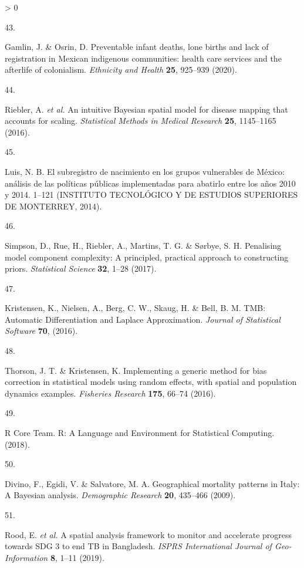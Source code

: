 \documentclass[
]{article}
\newlength{\cslhangindent}
\newlength{\csllabelwidth}
\newenvironment{CSLReferences}[2] %
 {%
  \setlength{\parindent}{0pt}
  \ifodd #1 \everypar{\setlength{\hangindent}{\cslhangindent}}\ignorespaces\fi
  \ifnum #2 > 0
  \setlength{\parskip}{#2\baselineskip}
  \fi
 }%
 {}
\newcommand{\CSLLeftMargin}[1]{\parbox[t]{\csllabelwidth}{#1}}
\newcommand{\CSLRightInline}[1]{\parbox[t]{\linewidth - \csllabelwidth}{#1}\break}
\begin{document}
\begin{CSLReferences}{0}{0}
\leavevmode\hypertarget{ref-Gamlin2020}{}%
\CSLLeftMargin{43. }
\CSLRightInline{Gamlin, J. \& Osrin, D. {Preventable infant deaths, lone births and lack of registration in Mexican indigenous communities: health care services and the afterlife of colonialism}. \emph{Ethnicity and Health} \textbf{25}, 925--939 (2020).}

\leavevmode\hypertarget{ref-Riebler2016}{}%
\CSLLeftMargin{44. }
\CSLRightInline{Riebler, A. \emph{et al.} {An intuitive Bayesian spatial model for disease mapping that accounts for scaling}. \emph{Statistical Methods in Medical Research} \textbf{25}, 1145--1165 (2016).}

\leavevmode\hypertarget{ref-Luis2014}{}%
\CSLLeftMargin{45. }
\CSLRightInline{Luis, N. B. {El subregistro de nacimiento en los grupos vulnerables de M{é}xico: an{á}lisis de las pol{í}ticas p{ú}blicas implementadas para abatirlo entre los a{ñ}os 2010 y 2014}. 1--121 (INSTITUTO TECNOL{Ó}GICO Y DE ESTUDIOS SUPERIORES DE MONTERREY, 2014).}

\leavevmode\hypertarget{ref-Simpson2017}{}%
\CSLLeftMargin{46. }
\CSLRightInline{Simpson, D., Rue, H., Riebler, A., Martins, T. G. \& Sørbye, S. H. {Penalising model component complexity: A principled, practical approach to constructing priors}. \emph{Statistical Science} \textbf{32}, 1--28 (2017).}

\leavevmode\hypertarget{ref-Kristensen2016}{}%
\CSLLeftMargin{47. }
\CSLRightInline{Kristensen, K., Nielsen, A., Berg, C. W., Skaug, H. \& Bell, B. M. {TMB: Automatic Differentiation and Laplace Approximation}. \emph{Journal of Statistical Software} \textbf{70}, (2016).}

\leavevmode\hypertarget{ref-Thorson2016}{}%
\CSLLeftMargin{48. }
\CSLRightInline{Thorson, J. T. \& Kristensen, K. {Implementing a generic method for bias correction in statistical models using random effects, with spatial and population dynamics examples}. \emph{Fisheries Research} \textbf{175}, 66--74 (2016).}

\leavevmode\hypertarget{ref-RCoreTeam2018}{}%
\CSLLeftMargin{49. }
\CSLRightInline{R Core Team. {R: A Language and Environment for Statistical Computing}. (2018).}

\leavevmode\hypertarget{ref-Divino2009}{}%
\CSLLeftMargin{50. }
\CSLRightInline{Divino, F., Egidi, V. \& Salvatore, M. A. {Geographical mortality patterns in Italy: A Bayesian analysis}. \emph{Demographic Research} \textbf{20}, 435--466 (2009).}

\leavevmode\hypertarget{ref-Rood2019}{}%
\CSLLeftMargin{51. }
\CSLRightInline{Rood, E. \emph{et al.} {A spatial analysis framework to monitor and accelerate progress towards SDG 3 to end TB in Bangladesh}. \emph{ISPRS International Journal of Geo-Information} \textbf{8}, 1--11 (2019).}


\end{CSLReferences}
\end{document}
